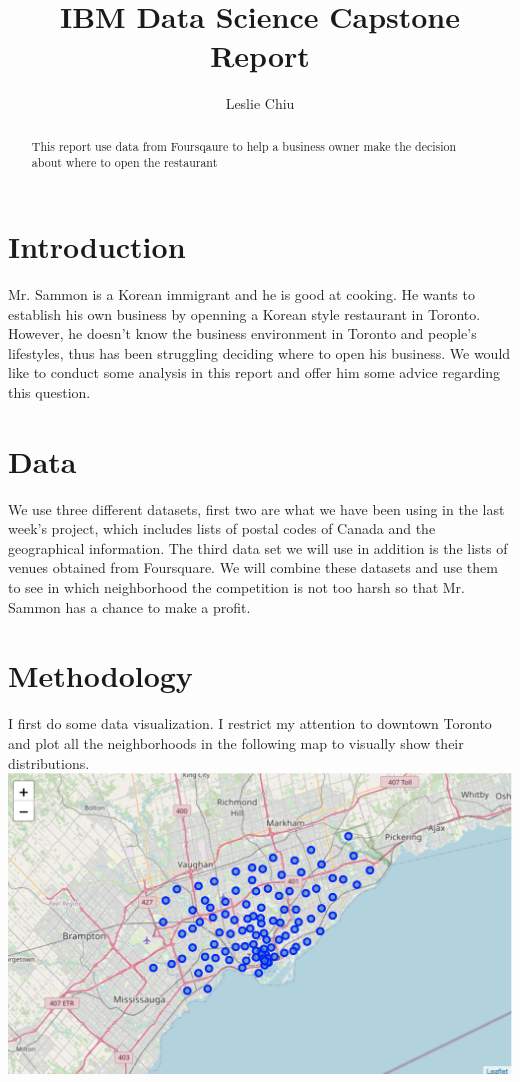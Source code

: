 \documentclass[12pt]{article}
\title{{IBM Data Science Capstone Report}
}
\author{Leslie Chiu}
\begin{document}
\maketitle


\begin{abstract}
This report use data from Foursqaure to help a business owner make the decision about where to open the restaurant
\end{abstract}

\section{Introduction}
Mr. Sammon is a Korean immigrant and he is good at cooking. He wants to establish his own business by openning a Korean style restaurant in Toronto. However, he doesn't know the business environment in Toronto and people's lifestyles, thus has been struggling deciding where to open his business. We would like to conduct some analysis in this report and offer him some advice regarding this question.

\section{Data}
We use three different datasets, first two are what we have been using in the last week's project, which includes lists of postal codes of Canada and the geographical information. The third data set we will use in addition is the lists of venues obtained from Foursquare. We will combine these datasets and use them to see in which neighborhood the competition is not too harsh so that Mr. Sammon has a chance to make a profit.

\section{Methodology}
I first do some data visualization. I restrict my attention to downtown Toronto and plot all the neighborhoods in the following map to visually show their distributions.\\
\includegraphics[scale=0.55]{image/1.png}
\end{document}
